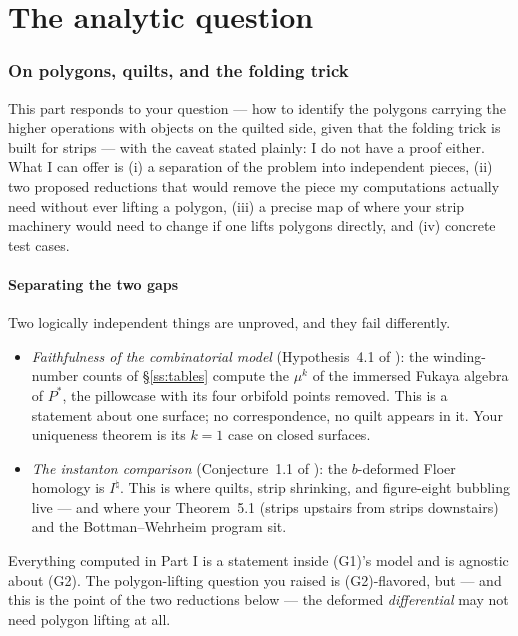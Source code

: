 \documentclass[11pt,reqno]{amsart}
\theoremstyle{plain}
\theoremstyle{definition}
\newcommand{\Inat}{I^{\natural}}
\newcommand{\pill}{P}
\newcommand{\bc}{b}
\begin{document}
\part{The analytic question}

\section{On polygons, quilts, and the folding trick}\label{sec:analytic}

This part responds to your question --- how to identify the polygons carrying the higher
operations with objects on the quilted side, given that the folding trick is built for strips
--- with the caveat stated plainly: I do not have a proof either. What I can offer is (i) a
separation of the problem into independent pieces, (ii) two proposed reductions that would
remove the piece my computations actually need without ever lifting a polygon, (iii) a precise
map of where your strip machinery would need to change if one lifts polygons directly, and
(iv) concrete test cases.

\subsection{Separating the two gaps}\label{ss:twogaps}
Two logically independent things are unproved, and they fail differently.
\begin{itemize}
\item[(G1)] \emph{Faithfulness of the combinatorial model} (Hypothesis~4.1 of \cite{P2}): the
winding-number counts of \S\ref{ss:tables} compute the $\mu^k$ of the immersed Fukaya algebra
of $\pill^*$, the pillowcase with its four orbifold points removed. This is a statement about one surface; no correspondence, no quilt appears in
it. Your uniqueness theorem is its $k=1$ case on closed surfaces.
\item[(G2)] \emph{The instanton comparison} (Conjecture~1.1 of \cite{CHKK}): the $\bc$-deformed Floer
homology is $\Inat$. This is where quilts, strip shrinking, and figure-eight bubbling live ---
and where your Theorem~5.1 (strips upstairs from strips downstairs) and the Bottman--Wehrheim
program sit.
\end{itemize}
Everything computed in Part I is a statement inside (G1)'s model and is agnostic about (G2).
The polygon-lifting question you raised is (G2)-flavored, but --- and this is the point of the
two reductions below --- the deformed \emph{differential} may not need polygon lifting at all.
\end{document}
